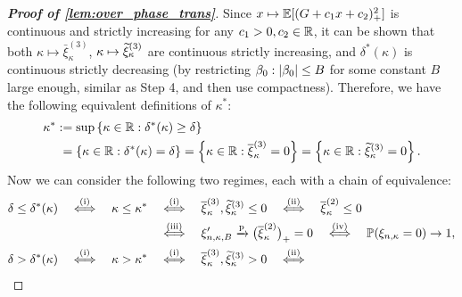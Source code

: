 \begin{proof}[\textbf{Proof of \cref{lem:over_phase_trans}}]
\vspace{0.5\baselineskip}
\noindent
Since $x \mapsto \mathbb{E}[(G + c_1 x + c_2)_+^2]$ is continuous and strictly increasing for any $c_1 > 0, c_2 \in \mathbb{R}$, it can be shown that both $\kappa \mapsto \bar\xi_{\kappa}^{(3)}$, $\kappa \mapsto \widetilde\xi_{\kappa}^{(3)}$ are continuous strictly increasing, and $\delta^*(\kappa)$ is continuous strictly decreasing (by restricting $\beta_0: \left|{\beta_0}\right| \le B$ for some constant $B$ large enough, similar as Step 4, and then use compactness). Therefore, we have the following equivalent definitions of $\kappa^*$:
\begin{equation}\label{eq:kappa_star}
    \begin{aligned}
        \kappa^*  & := \sup\left\{ \kappa \in \mathbb{R}: \delta^*(\kappa) \ge \delta \right\} \\
        & \phantom{:} = \left\{ \kappa \in \mathbb{R}: \delta^*(\kappa) = \delta \right\} 
        = \left\{ \kappa \in \mathbb{R}: \overline\xi_{\kappa}^{(3)} = 0 \right\}
        = \left\{ \kappa \in \mathbb{R}:  \widetilde\xi_{\kappa}^{(3)} = 0 \right\}.
    \end{aligned}
\end{equation}
Now we can consider the following two regimes, each with a chain of equivalence:
\begin{equation}
    \label{eq:phase_equiv}
    \begin{aligned}
        \delta \le \delta^*(\kappa) 
        \quad   \overset{\mathmakebox[0pt][c]{\text{(i)}}}{\Longleftrightarrow} \quad
        \kappa \le \kappa^*
        \quad & \overset{\mathmakebox[0pt][c]{\text{(i)}}}{\Longleftrightarrow} \quad
        \bar\xi_{\kappa}^{(3)}, \wt\xi_{\kappa}^{(3)} \le 0
        \quad   \overset{\mathmakebox[0pt][c]{\text{(ii)}}}{\Longleftrightarrow} \quad
        \bar\xi_{\kappa}^{(2)} \le 0 
        \\
        & \overset{\mathmakebox[0pt][c]{\text{(iii)}}}{\Longleftrightarrow} \quad
        \xi'_{n, \kappa, B}  \conp \bigl( \bar\xi^{(2)}_{\kappa} \bigr)_+ = 0
        \quad \overset{\mathmakebox[0pt][c]{\text{(iv)}}}{\Longleftrightarrow} \quad
        \P(\xi_{n, \kappa} = 0) \to 1,
        \\
        \delta > \delta^*(\kappa) 
        \quad   \overset{\mathmakebox[0pt][c]{\text{(i)}}}{\Longleftrightarrow} \quad
        \kappa > \kappa^*
        \quad & \overset{\mathmakebox[0pt][c]{\text{(i)}}}{\Longleftrightarrow} \quad
        \bar\xi_{\kappa}^{(3)}, \wt\xi_{\kappa}^{(3)} > 0
        \quad   \overset{\mathmakebox[0pt][c]{\text{(ii)}}}{\Longleftrightarrow} \quad

\end{aligned}
\end{equation}
\end{proof}
